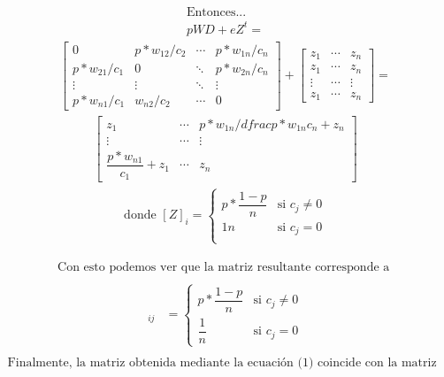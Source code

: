 \documentclass{article}
\begin{document}
	\begin{align*}
		\text{Entonces... }\\ 
		pWD + eZ^t=
	\end{align*}
	\begin{align*}
		\begin{bmatrix}
			0 & p*w_{12}/c_{2} & \cdots &p*w_{1n}/c_{n}\\
			p*w_{21}/c_{1}& 0 & \ddots &  p*w_{2n}/c_{n} \\
			\vdots & \vdots &\ddots &\vdots \\
			p*w_{n1}/c_{1} & w_{n2}/c_{2} & \cdots & 0
		\end{bmatrix} +  
		\begin{bmatrix}
			z_{1} & \cdots &z_{n}\\
			z_{1} & \cdots &  z_{n} \\
			\vdots &\cdots &\vdots \\
			z_{1} & \cdots & z_{n} 
		\end{bmatrix}	=
\end{align*}
\begin{align*}
 	\begin{bmatrix}
	z_{1} & \cdots &p*w_{1n}/dfrac{p*w_{1n}}{c_{n}} +z_{n}\\
	\vdots &\cdots &\vdots \\
	\dfrac{p*w_{n1}}{c_{1}}+z_{1} & \cdots & z_{n} \end{bmatrix}
 \end{align*} 
\begin{align*}
	\text{donde }  [Z]_{i} = \begin{cases}
		p*\dfrac{1-p}{n} & \text{si } c_{j} \neq 0 \\
		{1}{n} & \text{si } c_{j} = 0\\
\end{cases} \end{align*} 

\begin{align*}
\text{Con esto podemos ver que la matriz resultante corresponde a }\\
\end{align*}
\begin{align*}
[pWD +eZ^t]_{ij} &= \begin{cases}
	p*\dfrac{1-p}{n} & \text{si } c_{j} \neq 0 \\
	\dfrac{1}{n} & \text{si } c_{j} = 0
\end{cases}\\
\end{align*}
\begin{align*}
\text{Finalmente, la matriz obtenida mediante la ecuación (1) coincide con la matriz A. }
\end{align*}
\end{document}
